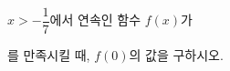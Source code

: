 $x>-\dfrac{1}{7}$에서 연속인 함수 $f(x)$가 \par\smallskip{}\par\smallskip\noindent 를 만족시킬 때, $f(0)$의 값을 구하시오.
